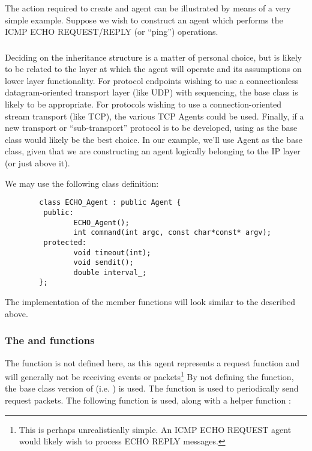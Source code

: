 The action required to create and agent can be illustrated
by means of a very simple example.
Suppose we wish to construct an agent which performs
the ICMP ECHO REQUEST/REPLY (or ``ping'') operations.

\subsubsection{}

Deciding on the inheritance structure is a matter of personal choice, but is
likely to be related to the layer at which the agent will operate
and its assumptions on lower layer functionality.
For protocol endpoints wishing to use a connectionless
datagram-oriented transport layer (like UDP) with sequencing,
the  base class is likely to be appropriate.
For protocols wishing to use a connection-oriented stream transport
(like TCP), the various TCP Agents could be used.
Finally, if a new transport or ``sub-transport'' protocol
is to be developed, using 
as the base class would likely be the best choice.
In our example, we'll use Agent as the base class, given that
we are constructing an agent logically belonging to the IP layer
(or just above it).

We may use the following class definition:
\begin{small}
\begin{verbatim}
        class ECHO_Agent : public Agent {
         public:
                ECHO_Agent();
                int command(int argc, const char*const* argv);
         protected:
                void timeout(int);
                void sendit();
                double interval_;
        };
\end{verbatim}
\end{small}

The implementation of the member functions will look similar to
the  described above.

\subsubsection{The  and  functions}

The  function is not defined here, as this agent
represents a request function and will generally not be receiving
events or packets\footnote{This is perhaps unrealistically simple.
An ICMP ECHO REQUEST agent would likely wish to process
ECHO REPLY messages.}
By not defining the  function, the base class version
of  (i.e. ) is used.
The  function is used to periodically send request packets.
The following  function is used, along with a helper
function :

